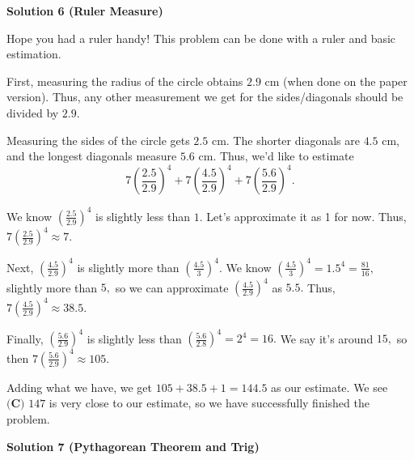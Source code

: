\begin{enumerate}
\textbf{Solution 6 (Ruler Measure)}

Hope you had a ruler handy! This problem can be done with a ruler and basic estimation.

 First, measuring the radius of the circle obtains $2.9$ cm (when done on the paper version). Thus, any other measurement we get for the sides/diagonals should be divided by $2.9$.

 Measuring the sides of the circle gets $2.5$ cm. The shorter diagonals are $4.5$ cm, and the longest diagonals measure $5.6$ cm. Thus, we'd like to estimate 
 \[7\left(\frac{2.5}{2.9}\right)^4 + 7\left(\frac{4.5}{2.9}\right)^4 + 7\left(\frac{5.6}{2.9}\right)^4.\]

 We know $\left(\frac{2.5}{2.9}\right)^4$ is slightly less than $1.$ Let's approximate it as 1 for now. Thus, $7\left(\frac{2.5}{2.9}\right)^4 \approx 7.$

 Next, $\left(\frac{4.5}{2.9}\right)^4$ is slightly more than $\left(\frac{4.5}{3}\right)^4.$ We know $\left(\frac{4.5}{3}\right)^4 = 1.5^4 = \frac{81}{16},$ slightly more than $5,$ so we can approximate $\left(\frac{4.5}{2.9}\right)^4$ as $5.5.$ Thus, $7\left(\frac{4.5}{2.9}\right)^4 \approx 38.5.$

 Finally, $\left(\frac{5.6}{2.9}\right)^4$ is slightly less than $\left(\frac{5.6}{2.8}\right)^4 = 2^4 = 16.$ We say it's around $15,$ so then $7\left(\frac{5.6}{2.9}\right)^4 \approx 105.$

 Adding what we have, we get $105 + 38.5 + 1 = 144.5$ as our estimate. We see $\boxed{\textbf{(C) }147}$ is very close to our estimate, so we have successfully finished the problem.

 



\textbf{Solution 7 (Pythagorean Theorem and Trig)}


\end{enumerate}
